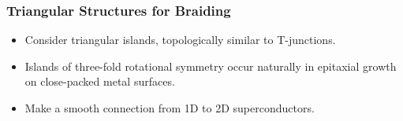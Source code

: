 \documentclass[xcolor=dvipsnames,10pt,aspectratio=169]{beamer}
\begin{document}
  \begin{frame}
    \frametitle{Triangular Structures for Braiding}
    \begin{multicols}{2}

    \begin{itemize}
      \item Consider triangular islands, topologically similar to T-junctions.
      \item Islands of three-fold rotational symmetry occur naturally in epitaxial growth on close-packed metal surfaces.
      \item Make a smooth connection from 1D to 2D superconductors.
    \end{itemize}
    \newline

    \begin{figure}
      \end{figure}
    \end{multicols}

  \end{frame}
\end{document}
